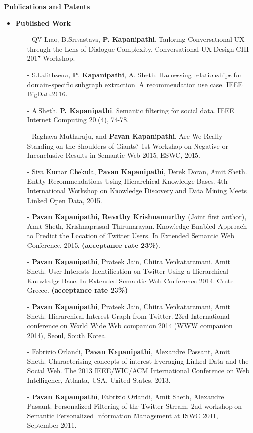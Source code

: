 \documentclass[letterpaper,9pt]{article}
\newcommand{\resheading}[1]{{\large \colorbox{mygrey}{\begin{minipage}{\textwidth}{\textbf{#1 \vphantom{p\^{E}}}}\end{minipage}}}}
\begin{document}
\resheading{Publications and Patents}
\begin{itemize}

\item\textbf{Published Work}
\begin{itemize}
\item[-] QV Liao, B.Srivastava, \textbf{P. Kapanipathi}. Tailoring Conversational UX through the Lens of Dialogue Complexity. Conversational UX Design CHI 2017 Workshop.
\item[-] S.Lalithsena, \textbf{P. Kapanipathi}, A. Sheth. Harnessing relationships for domain-specific subgraph extraction: A recommendation use case. IEEE BigData2016.
\item[-] A.Sheth, \textbf{P. Kapanipathi}. Semantic filtering for social data. IEEE Internet Computing 20 (4), 74-78.
\item[-] Raghava Mutharaju, and \textbf{Pavan Kapanipathi}. Are We Really Standing on the Shoulders of Giants? 1st Workshop on Negative or Inconclusive Results in Semantic Web 2015, ESWC, 2015.
\item[-] Siva Kumar Chekula, \textbf{Pavan Kapanipathi}, Derek Doran, Amit Sheth. Entity Recommendations Using Hierarchical Knowledge Bases. 4th  International Workshop on Knowledge Discovery and Data Mining Meets Linked Open Data, 2015.
\item[-] \textbf{Pavan Kapanipathi, Revathy Krishnamurthy} (Joint first author), Amit Sheth, Krishnaprasad Thirunarayan. Knowledge Enabled Approach to Predict the Location of Twitter Users. In Extended Semantic Web Conference, 2015. \textbf{(acceptance rate 23\%)}.
\item[-] \textbf{Pavan Kapanipathi}, Prateek Jain, Chitra Venkataramani, Amit Sheth. User Interests Identification on Twitter Using a Hierarchical Knowledge Base. In  Extended Semantic Web Conference 2014, Crete Greece. \textbf{(acceptance rate 23\%)}
\item[-] \textbf{Pavan Kapanipathi}, Prateek Jain, Chitra Venkataramani, Amit Sheth. Hierarchical Interest Graph from Twitter.  23rd International conference on World Wide Web companion 2014 (WWW companion 2014), Seoul, South Korea. 
\item[-] Fabrizio Orlandi, \textbf{Pavan Kapanipathi}, Alexandre Passant, Amit Sheth. Characterising concepts of interest leveraging Linked Data and the Social Web. The 2013 IEEE/WIC/ACM International Conference on Web Intelligence, Atlanta, USA, United States, 2013.
\item[-] \textbf{Pavan Kapanipathi}, Fabrizio Orlandi, Amit Sheth, Alexandre Passant. Personalized Filtering of the Twitter Stream. 2nd workshop on Semantic Personalized Information Management at ISWC 2011, September 2011. 

\end{itemize}
\end{itemize}
\end{document}
